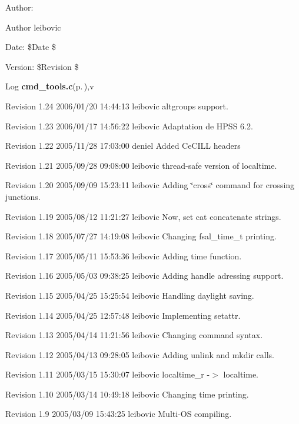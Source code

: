 \begin{Desc}
\item[Author:]\begin{Desc}
\item[Author]leibovic \end{Desc}
\end{Desc}
\begin{Desc}
\item[Date:]\$Date \$ \end{Desc}
\begin{Desc}
\item[Version:]\$Revision \$ \end{Desc}
\begin{Desc}
\item[Log]{\bf cmd\_\-tools.c}{\rm (p.\,\pageref{cmd__tools_8c})},v \end{Desc}
Revision 1.24 2006/01/20 14:44:13 leibovic altgroups support.

Revision 1.23 2006/01/17 14:56:22 leibovic Adaptation de HPSS 6.2.

Revision 1.22 2005/11/28 17:03:00 deniel Added Ce\-CILL headers

Revision 1.21 2005/09/28 09:08:00 leibovic thread-safe version of localtime.

Revision 1.20 2005/09/09 15:23:11 leibovic Adding \char`\"{}cross\char`\"{} command for crossing junctions.

Revision 1.19 2005/08/12 11:21:27 leibovic Now, set cat concatenate strings.

Revision 1.18 2005/07/27 14:19:08 leibovic Changing fsal\_\-time\_\-t printing.

Revision 1.17 2005/05/11 15:53:36 leibovic Adding time function.

Revision 1.16 2005/05/03 09:38:25 leibovic Adding handle adressing support.

Revision 1.15 2005/04/25 15:25:54 leibovic Handling daylight saving.

Revision 1.14 2005/04/25 12:57:48 leibovic Implementing setattr.

Revision 1.13 2005/04/14 11:21:56 leibovic Changing command syntax.

Revision 1.12 2005/04/13 09:28:05 leibovic Adding unlink and mkdir calls.

Revision 1.11 2005/03/15 15:30:07 leibovic localtime\_\-r -$>$ localtime.

Revision 1.10 2005/03/14 10:49:18 leibovic Changing time printing.

Revision 1.9 2005/03/09 15:43:25 leibovic Multi-OS compiling.

